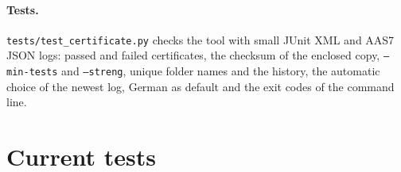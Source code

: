 \paragraph*{Tests.} \texttt{tests/test\_certificate.py} checks the tool
with small JUnit XML and AAS7 JSON logs: passed and failed certificates,
the checksum of the enclosed copy, \texttt{--min-tests} and
\texttt{--streng}, unique folder names and the history, the automatic
choice of the newest log, German as default and the exit codes of the
command line.

\section{Current tests}


